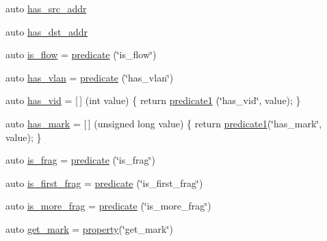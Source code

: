\begin{DoxyCompactItemize}
\item 
auto \hyperlink{namespacepfq__lang_1_1anonymous__namespace_02default_8hpp_03_aabc75799de679df702f4179ead82114c}{has\+\_\+src\+\_\+addr}
\item 
auto \hyperlink{namespacepfq__lang_1_1anonymous__namespace_02default_8hpp_03_af223a0513ceffa69c0b8535a7cca12da}{has\+\_\+dst\+\_\+addr}
\item 
auto \hyperlink{namespacepfq__lang_1_1anonymous__namespace_02default_8hpp_03_a32aab6804e2daac2458f7c050ed69cf1}{is\+\_\+flow} = \hyperlink{namespacepfq__lang_a6da898081fae7b71158845508a8d8599}{predicate} (\char`\"{}is\+\_\+flow\char`\"{})
\item 
auto \hyperlink{namespacepfq__lang_1_1anonymous__namespace_02default_8hpp_03_a30a0c8d9bcd28cd17c6c1699c3339c3f}{has\+\_\+vlan} = \hyperlink{namespacepfq__lang_a6da898081fae7b71158845508a8d8599}{predicate} (\char`\"{}has\+\_\+vlan\char`\"{})
\item 
auto \hyperlink{namespacepfq__lang_1_1anonymous__namespace_02default_8hpp_03_adddd2dea56164719f2853af158911a80}{has\+\_\+vid} = \mbox{[}$\,$\mbox{]} (int value) \{ return \hyperlink{namespacepfq__lang_ad4fceab90861beacc0490bd58a72bb05}{predicate1} (\char`\"{}has\+\_\+vid\char`\"{}, value); \}
\item 
auto \hyperlink{namespacepfq__lang_1_1anonymous__namespace_02default_8hpp_03_a0f9dc3f39bf9793e766b6312718483f1}{has\+\_\+mark} = \mbox{[}$\,$\mbox{]} (unsigned long value) \{ return \hyperlink{namespacepfq__lang_ad4fceab90861beacc0490bd58a72bb05}{predicate1}(\char`\"{}has\+\_\+mark\char`\"{}, value); \}
\item 
auto \hyperlink{namespacepfq__lang_1_1anonymous__namespace_02default_8hpp_03_a8fa70cc0ae09592136e8e04e60a98ab6}{is\+\_\+frag} = \hyperlink{namespacepfq__lang_a6da898081fae7b71158845508a8d8599}{predicate} (\char`\"{}is\+\_\+frag\char`\"{})
\item 
auto \hyperlink{namespacepfq__lang_1_1anonymous__namespace_02default_8hpp_03_a235bc51b1c287765f0a4bd391ed089a9}{is\+\_\+first\+\_\+frag} = \hyperlink{namespacepfq__lang_a6da898081fae7b71158845508a8d8599}{predicate} (\char`\"{}is\+\_\+first\+\_\+frag\char`\"{})
\item 
auto \hyperlink{namespacepfq__lang_1_1anonymous__namespace_02default_8hpp_03_a2e8c6d9921b25eecb2a880f73f1beb3c}{is\+\_\+more\+\_\+frag} = \hyperlink{namespacepfq__lang_a6da898081fae7b71158845508a8d8599}{predicate} (\char`\"{}is\+\_\+more\+\_\+frag\char`\"{})
\item 
auto \hyperlink{namespacepfq__lang_1_1anonymous__namespace_02default_8hpp_03_a85f5de783fc38d6c0539f1f4afac189b}{get\+\_\+mark} = \hyperlink{namespacepfq__lang_a1248b60c38a72d129e582dafe2f1127e}{property}(\char`\"{}get\+\_\+mark\char`\"{})

\end{DoxyCompactItemize}
